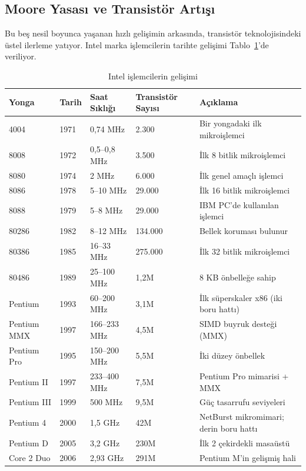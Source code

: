 \subsection{Moore Yasası ve Transistör Artışı}
\label{sec:moore-yasasi}

Bu beş nesil boyunca yaşanan hızlı gelişimin arkasında, transistör teknolojisindeki üstel ilerleme yatıyor. Intel marka işlemcilerin tarihte gelişimi Tablo~\ref{tab:intel-gelisim}'de veriliyor.

\begin{table}[ht!]
\centering
\caption{Intel işlemcilerin gelişimi}
\label{tab:intel-gelisim}
\footnotesize
\begin{tabular}{llllp{5cm}}
\toprule
\textbf{Yonga} & \textbf{Tarih} & \textbf{Saat Sıklığı} & \textbf{Transistör Sayısı} & \textbf{Açıklama} \\
\midrule
4004       & 1971 & 0,74 MHz   & 2.300   & Bir yongadaki ilk mikroişlemci \\
8008       & 1972 & 0,5--0,8 MHz & 3.500   & İlk 8 bitlik mikroişlemci \\
8080       & 1974 & 2 MHz      & 6.000   & İlk genel amaçlı işlemci \\
8086       & 1978 & 5--10 MHz  & 29.000  & İlk 16 bitlik mikroişlemci \\
8088       & 1979 & 5--8 MHz   & 29.000  & IBM PC'de kullanılan işlemci \\
80286      & 1982 & 8--12 MHz  & 134.000 & Bellek koruması bulunur \\
80386      & 1985 & 16--33 MHz & 275.000 & İlk 32 bitlik mikroişlemci \\
80486      & 1989 & 25--100 MHz& 1,2M    & 8 KB önbelleğe sahip \\
Pentium    & 1993 & 60--200 MHz& 3,1M    & İlk süperskaler x86 (iki boru hattı) \\
Pentium MMX& 1997 & 166--233 MHz& 4,5M   & SIMD buyruk desteği (MMX) \\
Pentium Pro& 1995 & 150--200 MHz& 5,5M   & İki düzey önbellek \\
Pentium II & 1997 & 233--400 MHz& 7,5M   & Pentium Pro mimarisi + MMX \\
Pentium III& 1999 & 500 MHz    & 9,5M    & Güç tasarrufu seviyeleri \\
Pentium 4  & 2000 & 1,5 GHz    & 42M     & NetBurst mikromimari; derin boru hattı \\
Pentium D  & 2005 & 3,2 GHz    & 230M    & İlk 2 çekirdekli masaüstü \\
Core 2 Duo & 2006 & 2,93 GHz   & 291M    & Pentium M'in gelişmiş hali \\

\end{tabular}
\end{table}
